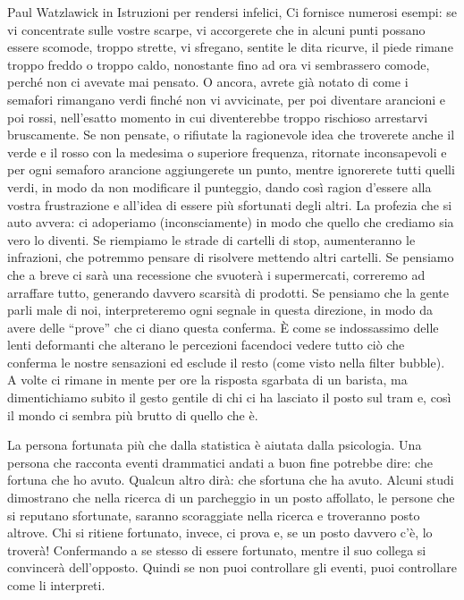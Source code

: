 \documentclass[12pt]{book} %
\begin{document}
Paul Watzlawick in Istruzioni per rendersi infelici, Ci fornisce
numerosi esempi: se vi concentrate sulle vostre scarpe, vi accorgerete che in alcuni punti possano essere scomode,
troppo strette, vi sfregano, sentite le dita ricurve, il piede rimane troppo freddo o troppo caldo, nonostante fino ad
ora vi sembrassero comode, perché non ci avevate mai pensato. O ancora, avrete già notato di come i semafori rimangano
verdi finché non vi avvicinate, per poi diventare arancioni e poi rossi, nell'esatto momento in
cui diventerebbe troppo rischioso arrestarvi bruscamente. Se non pensate, o rifiutate la ragionevole idea che troverete
anche il verde e il rosso con la medesima o superiore frequenza, ritornate inconsapevoli e per ogni semaforo arancione
aggiungerete un punto, mentre ignorerete tutti quelli verdi, in modo da non modificare il punteggio, dando così ragion
d'essere alla vostra frustrazione e all'idea di essere più sfortunati degli
altri. La profezia che si auto avvera: ci adoperiamo (inconsciamente) in modo che quello che crediamo sia vero lo
diventi. Se riempiamo le strade di cartelli di stop, aumenteranno le infrazioni, che potremmo pensare di risolvere
mettendo altri cartelli. Se pensiamo che a breve ci sarà una recessione che svuoterà i supermercati, correremo ad
arraffare tutto, generando davvero scarsità di prodotti. Se pensiamo che la gente parli male di noi, interpreteremo
ogni segnale in questa direzione, in modo da avere delle “prove” che ci diano questa conferma. È come se indossassimo
delle lenti deformanti che alterano le percezioni facendoci vedere tutto ciò che conferma le nostre sensazioni ed
esclude il resto (come visto nella filter bubble). A volte ci rimane in mente per ore la risposta sgarbata di un
barista, ma dimentichiamo subito il gesto gentile di chi ci ha lasciato il posto sul tram e, così il mondo ci sembra
più brutto di quello che è.

La persona fortunata più che dalla statistica è aiutata dalla psicologia. Una persona che racconta eventi drammatici
andati a buon fine potrebbe dire: che fortuna che ho avuto. Qualcun altro dirà: che sfortuna che ha avuto. 
Alcuni studi dimostrano che nella ricerca di un parcheggio in un posto affollato, le persone
che si reputano sfortunate, saranno scoraggiate nella ricerca e troveranno posto altrove. Chi si ritiene fortunato,
invece, ci prova e, se un posto davvero c'è, lo troverà! Confermando a se stesso di essere fortunato, mentre il suo
collega si convincerà dell'opposto. Quindi se non puoi controllare gli eventi, puoi controllare
come li interpreti.
\end{document}
